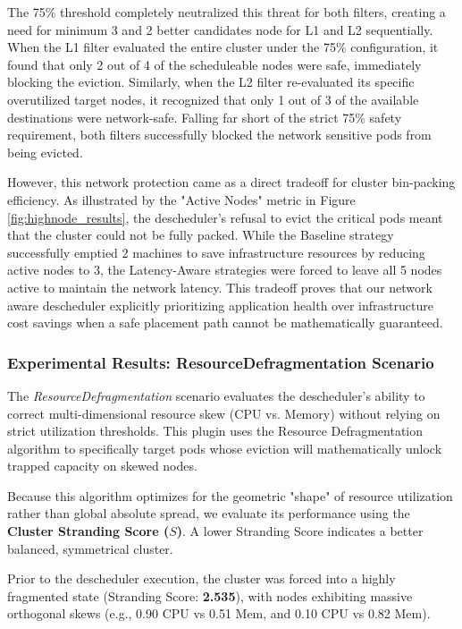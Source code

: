 The 75\% threshold completely neutralized this threat for both filters, creating a need for minimum 3 and 2 better candidates node for L1 and L2 sequentially. When the L1 filter evaluated the entire cluster under the 75\% configuration, it found that only 2 out of 4 of the scheduleable nodes were safe, immediately blocking the eviction. Similarly, when the L2 filter re-evaluated its specific overutilized target nodes, it recognized that only 1 out of 3 of the available destinations were network-safe. Falling far short of the strict 75\% safety requirement, both filters successfully blocked the network sensitive pods from being evicted.

However, this network protection came as a direct tradeoff for cluster bin-packing efficiency. As illustrated by the "Active Nodes" metric in Figure \ref{fig:highnode_results}, the descheduler's refusal to evict the critical pods meant that the cluster could not be fully packed. While the Baseline strategy successfully emptied 2 machines to save infrastructure resources by reducing active nodes to 3, the Latency-Aware strategies were forced to leave all 5 nodes active to maintain the network latency. This tradeoff proves that our network aware descheduler explicitly prioritizing application health over infrastructure cost savings when a safe placement path cannot be mathematically guaranteed.

\subsubsection{Experimental Results: ResourceDefragmentation Scenario}
\label{subsec:netaware4_resultanalysis3}
The \textit{ResourceDefragmentation} scenario evaluates the descheduler's ability to correct multi-dimensional resource skew (CPU vs. Memory) without relying on strict utilization thresholds. This plugin uses the Resource Defragmentation algorithm to specifically target pods whose eviction will mathematically unlock trapped capacity on skewed nodes.

Because this algorithm optimizes for the geometric "shape" of resource utilization rather than global absolute spread, we evaluate its performance using the \textbf{Cluster Stranding Score (\(S\))}. A lower Stranding Score indicates a better balanced, symmetrical cluster.

Prior to the descheduler execution, the cluster was forced into a highly fragmented state (Stranding Score: \textbf{2.535}), with nodes exhibiting massive orthogonal skews (e.g., 0.90 CPU vs 0.51 Mem, and 0.10 CPU vs 0.82 Mem).

